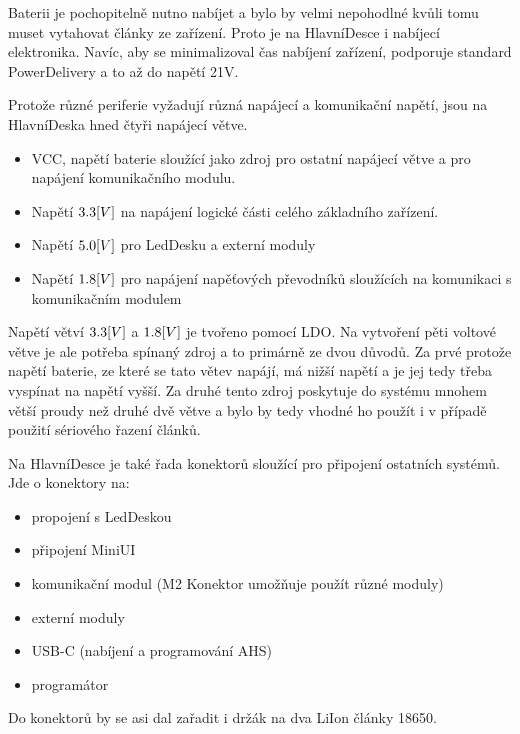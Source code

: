 Baterii je pochopitelně nutno nabíjet a bylo by velmi nepohodlné kvůli tomu muset vytahovat články ze zařízení.
Proto je na HlavníDesce i nabíjecí elektronika.
Navíc, aby se minimalizoval čas nabíjení zařízení, podporuje standard PowerDelivery a to až do napětí 21V.

Protože různé periferie vyžadují různá napájecí a komunikační napětí, jsou na HlavníDeska hned čtyři napájecí větve.
\begin{itemize}
    \item VCC, napětí baterie sloužící jako zdroj pro ostatní napájecí větve a pro napájení komunikačního modulu. 
    \item Napětí \(3.3\-[V]\) na napájení logické části celého základního zařízení.
    \item Napětí \(5.0\-[V]\) pro LedDesku a externí moduly
    \item Napětí \(1.8\-[V]\) pro napájení napěťových převodníků sloužících na komunikaci s komunikačním modulem 
\end{itemize}
Napětí větví \(3.3\-[V]\) a \(1.8\-[V]\) je tvořeno pomocí LDO.
Na vytvoření pěti voltové větve je ale potřeba spínaný zdroj a to primárně ze dvou důvodů.
Za prvé protože napětí baterie, ze které se tato větev napájí, má nižší napětí a je jej tedy třeba vyspínat na napětí vyšší.
Za druhé tento zdroj poskytuje do systému mnohem větší proudy než druhé dvě větve a bylo by tedy vhodné ho použít i v případě použití sériového řazení článků.

Na HlavníDesce je také řada konektorů sloužící pro připojení ostatních systémů.
Jde o konektory na:
\begin{itemize}
    \item propojení s LedDeskou                                             %
    \item připojení MiniUI                                                  %
    \item komunikační modul (M2 Konektor umožňuje použít různé moduly)      %
    \item externí moduly                                                    %
    \item USB-C (nabíjení a programování AHS)                               %
    \item programátor                                                       %
\end{itemize}
Do konektorů by se asi dal zařadit i držák na dva LiIon články 18650.

